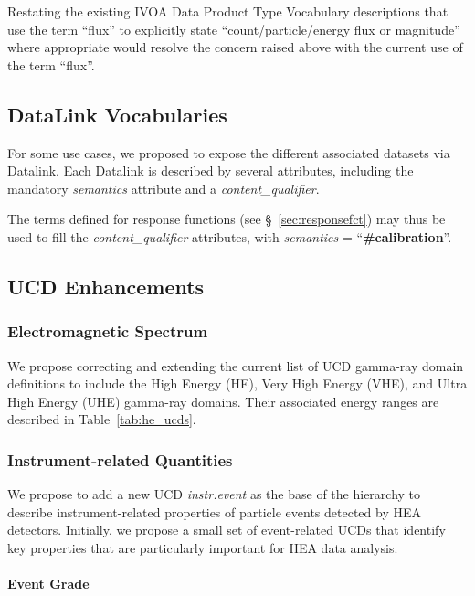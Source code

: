 \documentclass[11pt,a4paper]{ivoa}
\begin{document}
Restating the existing IVOA Data Product Type Vocabulary descriptions that use the term ``flux'' to explicitly state ``count/particle/energy flux or magnitude'' where appropriate would resolve the concern raised above with the current use of the term ``flux''.

\subsection{DataLink Vocabularies}\label{sec:DLs}

For some use cases, we proposed to expose the different associated datasets via Datalink. Each Datalink is described by several attributes, including the mandatory {\em semantics\/} attribute and a {\em content\_qualifier\/}.

The terms defined for response functions (see \S~\ref{sec:responsefct}) may thus be used to fill the {\em content\_qualifier\/} attributes, with {\em semantics\/} = ``{\bf \#calibration}''.


\subsection{UCD Enhancements}\label{sec:UCDs}

\subsubsection{Electromagnetic Spectrum}

We propose correcting and extending the current list of UCD gamma-ray domain definitions to include the High Energy (HE), Very High Energy (VHE), and Ultra High Energy (UHE) gamma-ray domains.  Their associated energy ranges are described in Table~\ref{tab:he_ucds}.

\subsubsection{Instrument-related Quantities}

We propose to add a new UCD {\em instr.event\/} as the base of the hierarchy to describe instrument-related properties of particle events detected by \gls{HEA} detectors.  Initially, we propose a small set of event-related UCDs that identify key properties that are particularly important for \gls{HEA} data analysis.

\paragraph{Event Grade}
\end{document}
